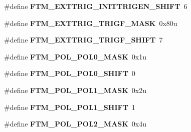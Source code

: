 \begin{DoxyCompactItemize}
\item 
\#define {\bfseries F\+T\+M\+\_\+\+E\+X\+T\+T\+R\+I\+G\+\_\+\+I\+N\+I\+T\+T\+R\+I\+G\+E\+N\+\_\+\+S\+H\+I\+FT}~6\hypertarget{group__FTM__Register__Masks_ga910785e872df234670a45cf1b00ad7c3}{}\label{group__FTM__Register__Masks_ga910785e872df234670a45cf1b00ad7c3}

\item 
\#define {\bfseries F\+T\+M\+\_\+\+E\+X\+T\+T\+R\+I\+G\+\_\+\+T\+R\+I\+G\+F\+\_\+\+M\+A\+SK}~0x80u\hypertarget{group__FTM__Register__Masks_gac6585f6c1888d29c05c5e8e3928d5a9e}{}\label{group__FTM__Register__Masks_gac6585f6c1888d29c05c5e8e3928d5a9e}

\item 
\#define {\bfseries F\+T\+M\+\_\+\+E\+X\+T\+T\+R\+I\+G\+\_\+\+T\+R\+I\+G\+F\+\_\+\+S\+H\+I\+FT}~7\hypertarget{group__FTM__Register__Masks_gae63a7bcedd63575b31712675d31475a2}{}\label{group__FTM__Register__Masks_gae63a7bcedd63575b31712675d31475a2}

\item 
\#define {\bfseries F\+T\+M\+\_\+\+P\+O\+L\+\_\+\+P\+O\+L0\+\_\+\+M\+A\+SK}~0x1u\hypertarget{group__FTM__Register__Masks_ga7ab70d13d9e83b5ae2beb7f5ba35dec3}{}\label{group__FTM__Register__Masks_ga7ab70d13d9e83b5ae2beb7f5ba35dec3}

\item 
\#define {\bfseries F\+T\+M\+\_\+\+P\+O\+L\+\_\+\+P\+O\+L0\+\_\+\+S\+H\+I\+FT}~0\hypertarget{group__FTM__Register__Masks_ga5cd0fca223b478bedc823f61829aadf9}{}\label{group__FTM__Register__Masks_ga5cd0fca223b478bedc823f61829aadf9}

\item 
\#define {\bfseries F\+T\+M\+\_\+\+P\+O\+L\+\_\+\+P\+O\+L1\+\_\+\+M\+A\+SK}~0x2u\hypertarget{group__FTM__Register__Masks_ga7ba292d039aa88301d93652d34a1d120}{}\label{group__FTM__Register__Masks_ga7ba292d039aa88301d93652d34a1d120}

\item 
\#define {\bfseries F\+T\+M\+\_\+\+P\+O\+L\+\_\+\+P\+O\+L1\+\_\+\+S\+H\+I\+FT}~1\hypertarget{group__FTM__Register__Masks_gab2e3af913f9d6e537df78c69259ee8f5}{}\label{group__FTM__Register__Masks_gab2e3af913f9d6e537df78c69259ee8f5}

\item 
\#define {\bfseries F\+T\+M\+\_\+\+P\+O\+L\+\_\+\+P\+O\+L2\+\_\+\+M\+A\+SK}~0x4u\hypertarget{group__FTM__Register__Masks_gaa23bd3b9b514732a3c218eece18538ae}{}\label{group__FTM__Register__Masks_gaa23bd3b9b514732a3c218eece18538ae}


\end{DoxyCompactItemize}

